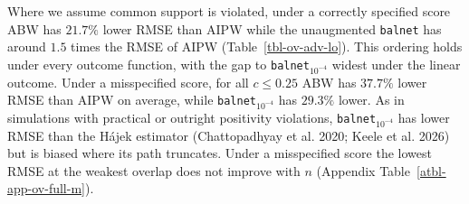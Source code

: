 \documentclass[
  12pt,
  a4paper,
]{article}
\begin{document}
\begin{table}[!htbp]

\caption{\label{tbl-ov-adv-hi}\(\bar R(\Theta)\) and
\(\bar s_m(\Theta)\) of A against B where common support holds.}


\end{table}%

Where we assume common support is violated, under a correctly specified
score ABW has \(21.7\%\) lower RMSE than AIPW while the unaugmented
\texttt{balnet} has around \(1.5\) times the RMSE of AIPW
(Table~\ref{tbl-ov-adv-lo}). This ordering holds under every outcome
function, with the gap to \texttt{balnet}\(_{10^{-4}}\) widest under the
linear outcome. Under a misspecified score, for all \(c \leq 0.25\) ABW
has \(37.7\%\) lower RMSE than AIPW on average, while
\texttt{balnet}\(_{10^{-4}}\) has \(29.3\%\) lower. As in simulations
with practical or outright positivity violations,
\texttt{balnet}\(_{10^{-4}}\) has lower RMSE than the Hájek estimator
(Chattopadhyay et al. 2020; Keele et al. 2026) but is biased where its
path truncates. Under a misspecified score the lowest RMSE at the
weakest overlap does not improve with \(n\)
(Appendix Table~\ref{atbl-app-ov-full-m}).
\end{document}

